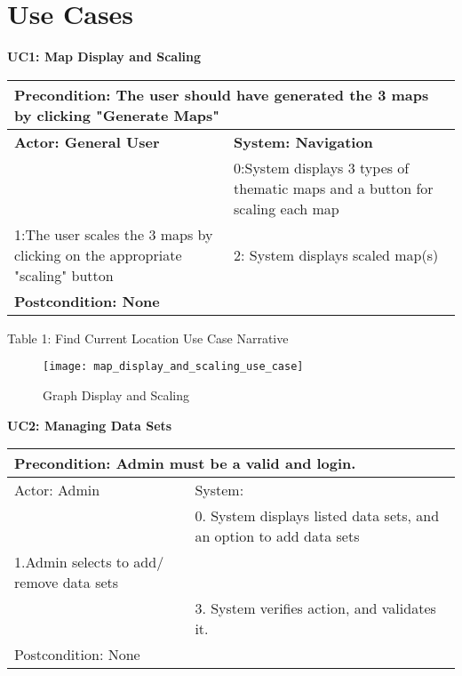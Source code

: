 \documentclass{article}
\begin{document}
	{
    \section{Use Cases}
\noindent\textbf{UC1: Map Display and Scaling}

\begin{flushleft}
\begin{tabular}{ |p{7cm}|p{7cm}| } 
   \hline
  \multicolumn{2}{|p{\textwidth}|}{\textbf{Precondition:} The user should have generated the 3 maps by clicking "Generate Maps"} \\
  \hline
\textbf {Actor: General User} & \textbf{System: Navigation}\\ 
\hline
 & 0:System displays 3 types of thematic maps and a button for scaling each map\\ 
\hline
 1:The user scales the 3 maps by clicking on the appropriate "scaling" button  & 2: System displays scaled map(s) \\
  \hline
  \multicolumn{2}{|p{\textwidth}|}{\textbf{Postcondition: None}} \\
   \hline

\end{tabular}

\end{flushleft}
\begin{center}
    	Table 1: Find Current Location Use Case Narrative
\end{center}

\begin{figure}[h!]
	\texttt{[image: map\_display\_and\_scaling\_use\_case]}
	\caption{Graph Display and Scaling}
\end{figure}

\pagebreak

\noindent\textbf{UC2: Managing Data Sets}
\begin{flushleft}
\begin{tabular}{ |p{}|p{}| }
  \hline
    \multicolumn{2}{|p{\textwidth}|}{Precondition: 
  Admin must be a valid and login.} \\
  \hline
  Actor: Admin & System:  \\
   \hline
   & 0. System displays listed data sets, and an option to add data sets \\
  \hline
    1.Admin selects to add/ remove data sets &\\
  \hline
   & 3. System verifies action, and validates it. \\
  \hline
  \multicolumn{2}{|p{\textwidth}|}{Postcondition: None} \\
   \hline
\end{tabular}
\end{flushleft}

}
\end{document}
